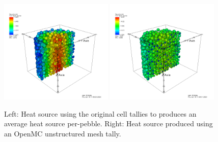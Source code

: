 \begin{figure}[!h]
\centering
\includegraphics[clip=true,width=0.48\textwidth]{Figures/openmc_cell_heat_source}
\includegraphics[clip=true,width=0.48\textwidth]{Figures/openmc_mesh_heat_source}
\caption{Left: Heat source using the original cell tallies to produces an average heat source per-pebble. Right: Heat source produced using an OpenMC unstructured mesh tally.}
\label{f:1568_openmc_heat_source}
\end{figure}

